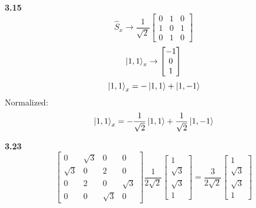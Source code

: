 \documentclass[english]{article}
\begin{document}
\begin{multicols*}{2}
\noindent
\textbf{3.15}\\
\[
\hat{S}_x\rightarrow\frac{1}{\sqrt{2}}
\begin{bmatrix}
0&1&0\\
1&0&1\\
0&1&0
\end{bmatrix}
\]
\[
\ket{1,1}_x\rightarrow
\begin{bmatrix}
-1\\
0\\
1
\end{bmatrix}
\]
$$\ket{1,1}_x=-\ket{1,1}+\ket{1,-1}$$
Normalized:
$$\ket{1,1}_x=-\frac{1}{\sqrt{2}}\ket{1,1}+\frac{1}{\sqrt{2}}\ket{1,-1}$$

\noindent
\textbf{3.23}\\
\[
\begin{bmatrix}
0&\sqrt{3}&0&0\\
\sqrt{3}&0&2&0\\
0&2&0&\sqrt{3}\\
0&0&\sqrt{3}&0
\end{bmatrix}
\frac{1}{2\sqrt{2}}
\begin{bmatrix}
1\\
\sqrt{3}\\
\sqrt{3}\\
1
\end{bmatrix}
=
\frac{3}{2\sqrt{2}}
\begin{bmatrix}
1\\
\sqrt{3}\\
\sqrt{3}\\
1
\end{bmatrix}
\]
\end{multicols*}
\end{document}
